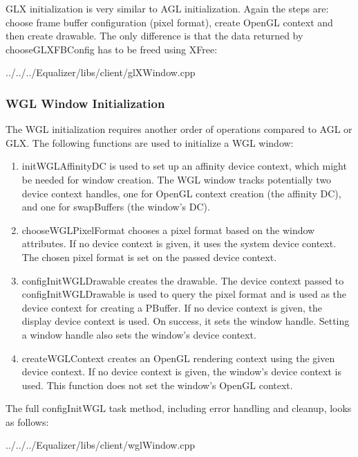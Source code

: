 \documentclass[10pt,a4]{scrartcl}
\begin{document}
GLX initialization is very similar to AGL initialization. Again the steps are:
choose frame buffer configuration (pixel format), create OpenGL context and then
create drawable. The only difference is that the data returned by
\textsf{chooseGLXFBConfig} has to be freed using \textsf{XFree}:

{\footnotesize
  {../../../Equalizer/libs/client/glXWindow.cpp}}


\subsubsection{WGL Window Initialization}

The WGL initialization requires another order of operations compared to
AGL or GLX. The following functions are used to initialize a WGL window:

\begin{enumerate}
\item\textsf{initWGLAffinityDC} is used to set up an affinity device
  context, which might be needed for window creation. The WGL window
  tracks potentially two device context handles, one for OpenGL context
  creation (the affinity DC), and one for \textsf{swapBuffers} (the
  window's DC).
\item\textsf{chooseWGLPixelFormat} chooses a pixel format based on the
  window attributes. If no device context is given, it uses the system
  device context. The chosen pixel format is set on the passed device
  context.
\item\textsf{configInitWGLDrawable} creates the drawable. The device
  context passed to \textsf{configInitWGLDrawable} is used to query the
  pixel format and is used as the device context for creating a
  PBuffer. If no device context is given, the display device context is
  used. On success, it sets the window handle. Setting a window handle
  also sets the window's device context.
\item\textsf{createWGLContext} creates an OpenGL rendering context using
  the given device context. If no device context is given, the window's
  device context is used. This function does not set the window's OpenGL
  context.
\end{enumerate}

The full \textsf{configInitWGL} task method, including error handling
and cleanup, looks as follows:

{\footnotesize
  {../../../Equalizer/libs/client/wglWindow.cpp}}
\end{document}
